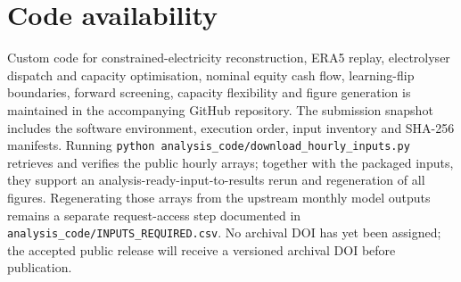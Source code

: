 \documentclass[11pt,a4paper]{article}
\begin{document}
\section*{Code availability}

Custom code for constrained-electricity reconstruction, ERA5 replay, electrolyser dispatch and capacity optimisation, nominal equity cash flow, learning-flip boundaries, forward screening, capacity flexibility and figure generation is maintained in the accompanying GitHub repository. The submission snapshot includes the software environment, execution order, input inventory and SHA-256 manifests. Running \texttt{python analysis\_code/download\_hourly\_inputs.py} retrieves and verifies the public hourly arrays; together with the packaged inputs, they support an analysis-ready-input-to-results rerun and regeneration of all figures. Regenerating those arrays from the upstream monthly model outputs remains a separate request-access step documented in \texttt{analysis\_code/INPUTS\_REQUIRED.csv}. No archival DOI has yet been assigned; the accepted public release will receive a versioned archival DOI before publication.
\end{document}
